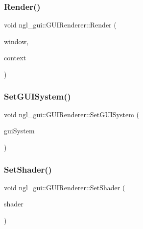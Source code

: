 \subsubsection{\texorpdfstring{Render()}{Render()}\hspace{0.1cm}{\footnotesize\ttfamily [5/5]}}
{\footnotesize\ttfamily void ngl\+\_\+gui\+::\+G\+U\+I\+Renderer\+::\+Render (\begin{DoxyParamCaption}\item[{\mbox{\hyperlink{classngl__gui_1_1_window}{Window}} $\ast$}]{window,  }\item[{\mbox{\hyperlink{classngl__gui_1_1_g_u_i_rendering_context}{G\+U\+I\+Rendering\+Context}} \&}]{context }\end{DoxyParamCaption})}

\mbox{\label{classngl__gui_1_1_g_u_i_renderer_a80a4dfa6dbf0df163b24687aa1eea9f1}} 
\subsubsection{\texorpdfstring{Set\+G\+U\+I\+System()}{SetGUISystem()}}
{\footnotesize\ttfamily void ngl\+\_\+gui\+::\+G\+U\+I\+Renderer\+::\+Set\+G\+U\+I\+System (\begin{DoxyParamCaption}\item[{\mbox{\hyperlink{classngl__gui_1_1_g_u_i_system}{G\+U\+I\+System}} $\ast$}]{gui\+System }\end{DoxyParamCaption})}

\mbox{\label{classngl__gui_1_1_g_u_i_renderer_aa1744c6a938e609a87d55a8efece3993}} 
\subsubsection{\texorpdfstring{Set\+Shader()}{SetShader()}}
{\footnotesize\ttfamily void ngl\+\_\+gui\+::\+G\+U\+I\+Renderer\+::\+Set\+Shader (\begin{DoxyParamCaption}\item[{\mbox{\hyperlink{classec_1_1_shader}{ec\+::\+Shader}} $\ast$}]{shader }\end{DoxyParamCaption})}




